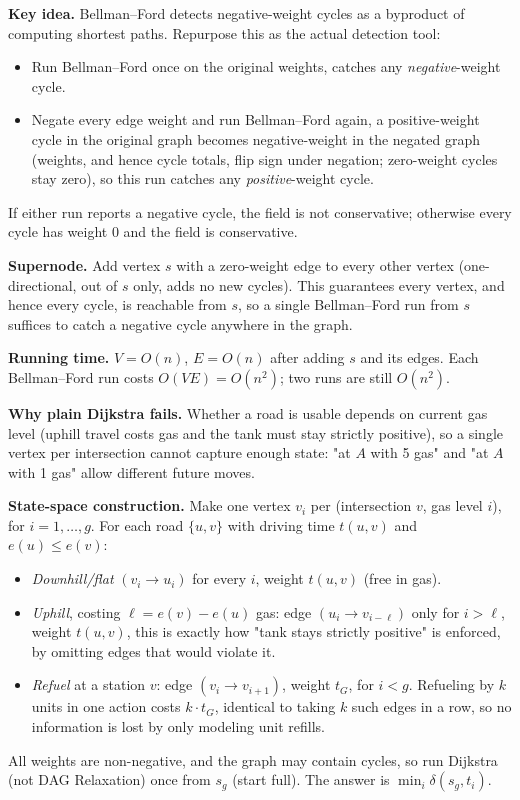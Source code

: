 \documentclass[12pt,twoside]{article}
\begin{document}
\begin{problems}
\textbf{Key idea.} Bellman--Ford detects negative-weight cycles as a
byproduct of computing shortest paths. Repurpose this as the actual
detection tool:
\begin{itemize}
  \item Run Bellman--Ford once on the original weights, catches any
  \emph{negative}-weight cycle.
  \item Negate every edge weight and run Bellman--Ford again, a
  positive-weight cycle in the original graph becomes negative-weight in the
  negated graph (weights, and hence cycle totals, flip sign under negation;
  zero-weight cycles stay zero), so this run catches any \emph{positive}-weight
  cycle.
\end{itemize}
If either run reports a negative cycle, the field is not conservative;
otherwise every cycle has weight $0$ and the field is conservative.

\textbf{Supernode.} Add vertex $s$ with a zero-weight edge to every other
vertex (one-directional, out of $s$ only, adds no new cycles). This
guarantees every vertex, and hence every cycle, is reachable from $s$, so a
single Bellman--Ford run from $s$ suffices to catch a negative cycle anywhere
in the graph.

\textbf{Running time.} $V=O(n)$, $E=O(n)$ after adding $s$ and its edges.
Each Bellman--Ford run costs $O(VE)=O(n^2)$; two runs are still $O(n^2)$.

\newpage

\problem  %
\textbf{Why plain Dijkstra fails.} Whether a road is usable depends on
current gas level (uphill travel costs gas and the tank must stay strictly
positive), so a single vertex per intersection cannot capture enough state:
"at $A$ with 5 gas" and "at $A$ with 1 gas" allow different future moves.

\textbf{State-space construction.} Make one vertex $v_i$ per (intersection
$v$, gas level $i$), for $i=1,\dots,g$. For each road $\{u,v\}$ with driving
time $t(u,v)$ and $e(u)\le e(v)$:
\begin{itemize}
  \item \emph{Downhill/flat} $(v_i \to u_i)$ for every $i$, weight $t(u,v)$
  (free in gas).
  \item \emph{Uphill}, costing $\ell=e(v)-e(u)$ gas: edge $(u_i \to v_{i-\ell})$
  only for $i>\ell$, weight $t(u,v)$, this is exactly how "tank stays
  strictly positive" is enforced, by omitting edges that would violate it.
  \item \emph{Refuel} at a station $v$: edge $(v_i \to v_{i+1})$, weight
  $t_G$, for $i<g$. Refueling by $k$ units in one action costs $k\cdot t_G$,
  identical to taking $k$ such edges in a row, so no information is lost by
  only modeling unit refills.
\end{itemize}
All weights are non-negative, and the graph may contain cycles, so run
Dijkstra (not DAG Relaxation) once from $s_g$ (start full). The answer is
$\min_{i} \delta(s_g, t_i)$.


\end{problems}
\end{document}

